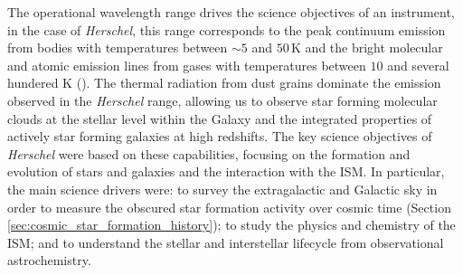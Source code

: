 The operational wavelength range drives the science objectives of an instrument, in the case of \textit{Herschel}, this range corresponds to the peak continuum emission from bodies with temperatures between $\sim5$ and $50\,$K and the bright molecular and atomic emission lines from gases with temperatures between $10$ and several hundered K (\citealt{Pilbratt_2008}). The thermal radiation from dust grains dominate the emission observed in the \textit{Herschel} range, allowing us to observe star forming molecular clouds at the stellar level within the Galaxy and the integrated properties of actively star forming galaxies at high redshifts. The key science objectives of \textit{Herschel} were based on these capabilities, focusing on the formation and evolution of stars and galaxies and the interaction with the ISM. In particular, the main science drivers were: to survey the extragalactic and Galactic sky in order to measure the obscured star formation activity over cosmic time (Section \ref{sec:cosmic_star_formation_history}); to study the physics and chemistry of the ISM; and to understand the stellar and interstellar lifecycle from observational astrochemistry.


